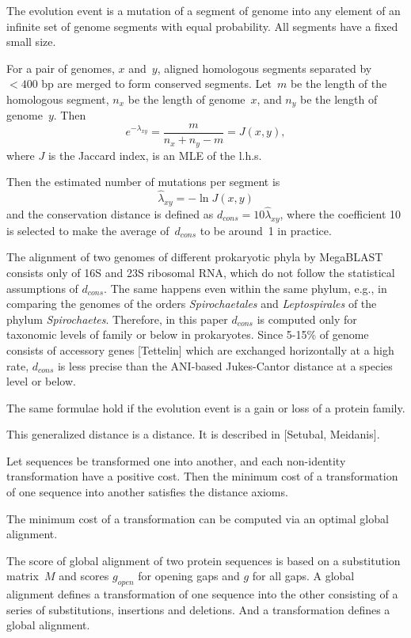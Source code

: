 \documentclass[10pt,a4paper]{article}
\begin{document}
The evolution event is a mutation of a segment of genome into any element of an infinite set of genome segments with equal probability.
All segments have a fixed small size.

For a pair of genomes, $x$ and~$y$, aligned homologous segments separated by $< 400$ bp are merged to form conserved segments.
Let~$m$ be the length of the homologous segment,
$n_x$ be the length of genome~$x$, and
$n_y$ be the length of genome~$y$.
Then
$$ e^{-\lambda_{xy}} = \frac m {n_x + n_y - m} = J(x,y),$$
where $J$ is the Jaccard index,
is an MLE of the l.h.s.

Then the estimated number of mutations per segment is
$$ \hat \lambda_{xy} = - \ln J(x,y) $$
and the conservation distance is defined as
$ d_{cons} = 10 \hat \lambda_{xy}$,
where the coefficient 10 is selected to make the average of~$d_{cons}$ to be around~1 in practice.

The alignment of two genomes of different prokaryotic phyla by MegaBLAST consists only of 16S and 23S ribosomal RNA,
which do not follow the statistical assumptions of $d_{cons}$.
The same happens even within the same phylum,
e.g., in comparing the genomes of the orders {\it Spirochaetales} and {\it Leptospirales} of the phylum {\it Spirochaetes}.
Therefore, in this paper $d_{cons}$ is computed only for taxonomic levels of family or below in prokaryotes.
Since 5-15\% of genome consists of accessory genes [Tettelin] which are exchanged horizontally at a high rate, $d_{cons}$ is less precise than the ANI-based Jukes-Cantor distance at a species level or below.

The same formulae hold if the evolution event is a gain or loss of a protein family.




This generalized distance is a distance.
It is described in [Setubal, Meidanis].

Let sequences be transformed one into another, and each non-identity transformation have a positive cost.
Then the minimum cost of a transformation of one sequence into another satisfies the distance axioms.

The minimum cost of a transformation can be computed via an optimal global alignment.

The score of global alignment of two protein sequences is based on a substitution matrix~$M$ and scores $g_{open}$ for opening gaps and $g$ for all gaps.
A global alignment defines a transformation of one sequence into the other consisting of a series of substitutions, insertions and deletions.
And a transformation defines a global alignment.
\end{document}
